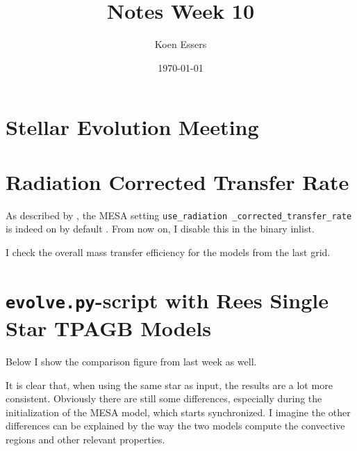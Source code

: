 \documentclass[a4paper,10pt]{article}
\title{Notes Week 10}
\author{Koen Essers}
\date{\today}
\begin{document}
\setuplayout
\section{Stellar Evolution Meeting}
\begin{figure}[ht]
    \centering
\end{figure}
\section{Radiation Corrected Transfer Rate}
As described by \citet{temmink2025}, the MESA setting \lstinline[style=output, breaklines=true]|use_radiation _corrected_transfer_rate| is indeed on by default
. From now on, I disable this in the binary inlist.

I check the overall mass transfer efficiency for the models from the last grid.
\begin{figure}[ht]
    \centering
\end{figure}


\section{\texorpdfstring{\texttt{evolve.py}}{evolve.py}-script with Rees Single Star TPAGB Models}

\begin{figure}[ht]
    \centering
\end{figure}
\nextpage
Below I show the comparison figure from last week as well.
\begin{figure}[ht]
    \centering
\end{figure}
It is clear that, when using the same star as input, the results are a lot more consistent. Obviously there are still some differences, especially during the initialization of the MESA model, which starts synchronized. I imagine the other differences can be explained by the way the two models compute the convective regions and other relevant properties.
\end{document}
